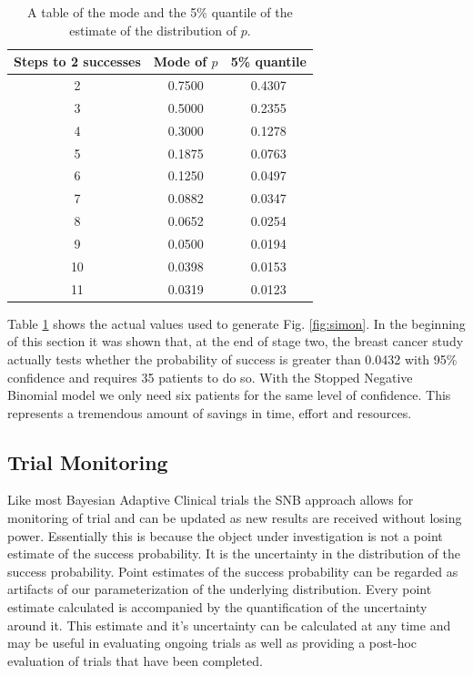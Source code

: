 \documentclass[12pt]{article}         %
\begin{document}
\begin{table}
\begin{center}
\begin{tabular}{|c|c|c|} \hline
{\bf Steps to 2 successes} & {\bf Mode of $p$} & {\bf 5\% quantile} \\ \hline
2 & 0.7500  & 0.4307 \\ \hline
3 & 0.5000  & 0.2355 \\ \hline
4 & 0.3000  & 0.1278 \\ \hline
5 & 0.1875  & 0.0763 \\ \hline
6 & 0.1250  & 0.0497 \\ \hline
7 & 0.0882  & 0.0347 \\ \hline
8 & 0.0652  & 0.0254 \\ \hline
9 & 0.0500  & 0.0194 \\ \hline
10 & 0.0398 & 0.0153 \\ \hline
11 & 0.0319 & 0.0123 \\ \hline
\end{tabular} 
\end{center}
\caption{
A table of the mode and the 5\% quantile of the estimate of the distribution of $p$.
}
\label{tab:simon}
\end{table} 

Table \ref{tab:simon} shows the actual values used to generate Fig. \ref{fig:simon}. In the beginning of this section it was shown that, at the end of stage two, the breast cancer study actually tests whether the probability of success is greater than 0.0432 with 95\% confidence and requires 35 patients to do so. With the Stopped Negative Binomial model we only need six patients for the same level of confidence. This represents a tremendous amount of savings in time, effort and resources.

\subsection{Trial Monitoring}

Like most Bayesian Adaptive Clinical trials the SNB approach allows for monitoring of trial and can be updated as new results are received without losing power. Essentially this is because the object under investigation is not a point estimate of the success probability. It is the uncertainty in the distribution of the success probability. Point estimates of the success probability can be regarded as artifacts of our parameterization of the underlying distribution. Every point estimate calculated is accompanied by the quantification of the uncertainty around it. This estimate and it's uncertainty can be calculated at any time and may be useful in evaluating ongoing trials as well as providing a post-hoc evaluation of trials that have been completed.
\end{document}

